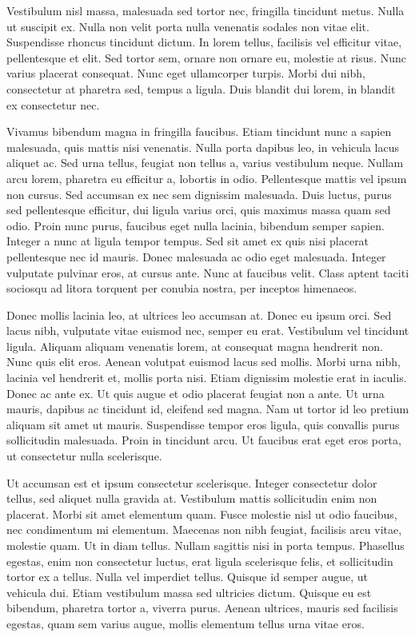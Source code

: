 Vestibulum nisl massa, malesuada sed tortor nec, fringilla tincidunt metus. Nulla ut suscipit ex. Nulla non velit porta nulla venenatis sodales non vitae elit. Suspendisse rhoncus tincidunt dictum. In lorem tellus, facilisis vel efficitur vitae, pellentesque et elit. Sed tortor sem, ornare non ornare eu, molestie at risus. Nunc varius placerat consequat. Nunc eget ullamcorper turpis. Morbi dui nibh, consectetur at pharetra sed, tempus a ligula. Duis blandit dui lorem, in blandit ex consectetur nec.

Vivamus bibendum magna in fringilla faucibus. Etiam tincidunt nunc a sapien malesuada, quis mattis nisi venenatis. Nulla porta dapibus leo, in vehicula lacus aliquet ac. Sed urna tellus, feugiat non tellus a, varius vestibulum neque. Nullam arcu lorem, pharetra eu efficitur a, lobortis in odio. Pellentesque mattis vel ipsum non cursus. Sed accumsan ex nec sem dignissim malesuada. Duis luctus, purus sed pellentesque efficitur, dui ligula varius orci, quis maximus massa quam sed odio. Proin nunc purus, faucibus eget nulla lacinia, bibendum semper sapien. Integer a nunc at ligula tempor tempus. Sed sit amet ex quis nisi placerat pellentesque nec id mauris. Donec malesuada ac odio eget malesuada. Integer vulputate pulvinar eros, at cursus ante. Nunc at faucibus velit. Class aptent taciti sociosqu ad litora torquent per conubia nostra, per inceptos himenaeos.

Donec mollis lacinia leo, at ultrices leo accumsan at. Donec eu ipsum orci. Sed lacus nibh, vulputate vitae euismod nec, semper eu erat. Vestibulum vel tincidunt ligula. Aliquam aliquam venenatis lorem, at consequat magna hendrerit non. Nunc quis elit eros. Aenean volutpat euismod lacus sed mollis. Morbi urna nibh, lacinia vel hendrerit et, mollis porta nisi. Etiam dignissim molestie erat in iaculis. Donec ac ante ex. Ut quis augue et odio placerat feugiat non a ante. Ut urna mauris, dapibus ac tincidunt id, eleifend sed magna. Nam ut tortor id leo pretium aliquam sit amet ut mauris. Suspendisse tempor eros ligula, quis convallis purus sollicitudin malesuada. Proin in tincidunt arcu. Ut faucibus erat eget eros porta, ut consectetur nulla scelerisque.

Ut accumsan est et ipsum consectetur scelerisque. Integer consectetur dolor tellus, sed aliquet nulla gravida at. Vestibulum mattis sollicitudin enim non placerat. Morbi sit amet elementum quam. Fusce molestie nisl ut odio faucibus, nec condimentum mi elementum. Maecenas non nibh feugiat, facilisis arcu vitae, molestie quam. Ut in diam tellus. Nullam sagittis nisi in porta tempus. Phasellus egestas, enim non consectetur luctus, erat ligula scelerisque felis, et sollicitudin tortor ex a tellus. Nulla vel imperdiet tellus. Quisque id semper augue, ut vehicula dui. Etiam vestibulum massa sed ultricies dictum. Quisque eu est bibendum, pharetra tortor a, viverra purus. Aenean ultrices, mauris sed facilisis egestas, quam sem varius augue, mollis elementum tellus urna vitae eros.


